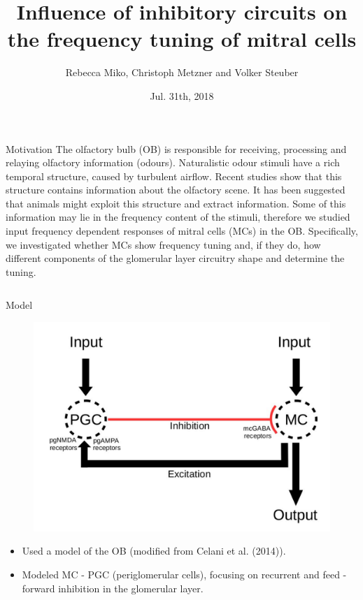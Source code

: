 \documentclass[final,hyperref={pdfpagelabels=false}]{beamer}
\title{Influence of inhibitory circuits on the frequency tuning of mitral cells}
\author[Miko]{Rebecca Miko, Christoph Metzner and Volker Steuber}
\institute{University of Hertfordshire, AL10 9AB, UK}
\date{Jul. 31th, 2018}
\begin{document}
\begin{frame}{} 
\begin{block}{Motivation}
The olfactory bulb (OB) is responsible for receiving, processing and relaying olfactory information (odours). 
Naturalistic odour stimuli have a rich temporal structure, caused by turbulent airflow.
Recent studies show that this structure contains information about the olfactory scene. 
It has been suggested that animals might exploit this structure and extract information. 
Some of this information may lie in the frequency content of the stimuli, therefore we studied input frequency dependent responses of mitral cells (MCs) in the OB.
Specifically, we investigated whether MCs show frequency tuning and, if they do, how different components of the glomerular layer circuitry  shape and determine the tuning.
\end{block}    

\begin{columns}[t]
\begin{column}{.48\linewidth}

\begin{block}{Model} 
\begin{figure}
\center
\includegraphics[scale=0.6]{images/Circuit_Diagram}
\end{figure}
\begin{itemize}
\item Used a model of the OB (modified from Celani et al. (2014)).
\item Modeled MC - PGC (periglomerular cells), focusing on recurrent and feed - forward inhibition in the glomerular layer.
\end{itemize}
\end{block}


\end{column}
\end{columns}
\end{frame}
\end{document}
